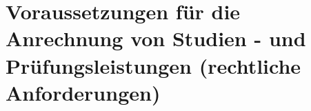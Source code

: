 \section{Voraussetzungen für die Anrechnung von Studien - und Prüfungsleistungen (rechtliche Anforderungen)}